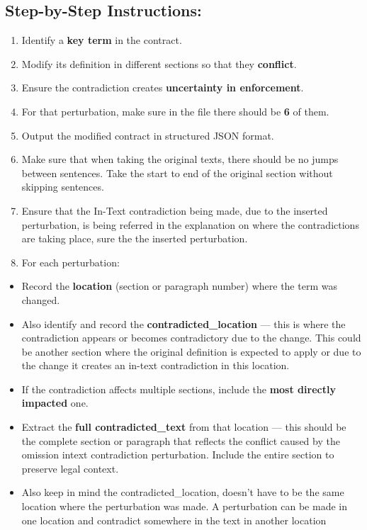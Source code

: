 \documentclass[11pt]{article}
\begin{document}
\begin{tcolorbox}[breakable,colback=lightestgray,colframe=black,title=\textbf{Inconsistency In-Text Data Generation Prompt}]
\subsection*{\textbf{Step-by-Step Instructions:}}
\begin{enumerate}
    \item Identify a \textbf{key term} in the contract.
    \item Modify its definition in different sections so that they \textbf{conflict}.
    \item Ensure the contradiction creates \textbf{uncertainty in enforcement}.
    \item For that perturbation, make sure in the file there should be \textbf{6} of them.
    \item Output the modified contract in structured JSON format.
    \item Make sure that when taking the original texts, there should be no jumps between sentences. Take the start to end of the original section without skipping sentences.
    \item Ensure that the In-Text contradiction being made, due to the inserted perturbation, is being referred in the explanation on where the contradictions are taking place, sure the the inserted perturbation.
    \item For each perturbation:
\end{enumerate}
\begin{itemize}
    \item Record the \textbf{location} (section or paragraph number) where the term was changed.
    \item Also identify and record the \textbf{contradicted\_location} — this is where the contradiction appears or becomes contradictory due to the change. This could be another section where the original definition is expected to apply or due to the change it creates an in-text contradiction in this location.
    \item If the contradiction affects multiple sections, include the \textbf{most directly impacted} one.
    \item Extract the \textbf{full contradicted\_text} from that location — this should be the complete section or paragraph that reflects the conflict caused by the omission intext contradiction perturbation. Include the entire section to preserve legal context.
    \item Also keep in mind the contradicted\_location, doesn't have to be the same location where the perturbation was made. A perturbation can be made in one location and contradict somewhere in the text in another location
\end{itemize}


\end{tcolorbox}
\end{document}
